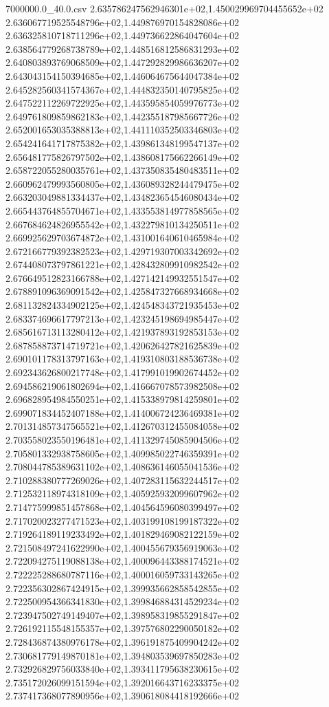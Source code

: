 \begin{filecontents*}{7000000.0_40.0.csv}
2.635786247562946301e+02,1.450029969704455652e+02
2.636067719525548796e+02,1.449876970154828086e+02
2.636325810718711296e+02,1.449736622864047604e+02
2.638564779268738789e+02,1.448516812586831293e+02
2.640803893769068509e+02,1.447292829986636207e+02
2.643043154150394685e+02,1.446064675644047384e+02
2.645282560341574367e+02,1.444832350140795825e+02
2.647522112269722925e+02,1.443595854059976773e+02
2.649761809859862183e+02,1.442355187985667726e+02
2.652001653035388813e+02,1.441110352503346803e+02
2.654241641717875382e+02,1.439861348199547137e+02
2.656481775826797502e+02,1.438608175662266149e+02
2.658722055280035761e+02,1.437350835480483511e+02
2.660962479993560805e+02,1.436089328244479475e+02
2.663203049881334437e+02,1.434823654546080434e+02
2.665443764855704671e+02,1.433553814977858565e+02
2.667684624826955542e+02,1.432279810134250511e+02
2.669925629703674872e+02,1.431001640610465984e+02
2.672166779392382523e+02,1.429719307003342692e+02
2.674408073797861221e+02,1.428432809910982542e+02
2.676649512823166788e+02,1.427142149932551547e+02
2.678891096369091542e+02,1.425847327668934668e+02
2.681132824334902125e+02,1.424548343721935453e+02
2.683374696617797213e+02,1.423245198694985447e+02
2.685616713113280412e+02,1.421937893192853153e+02
2.687858873714719721e+02,1.420626427821625839e+02
2.690101178313797163e+02,1.419310803188536738e+02
2.692343626800217748e+02,1.417991019902674452e+02
2.694586219061802694e+02,1.416667078573982508e+02
2.696828954984550251e+02,1.415338979814259801e+02
2.699071834452407188e+02,1.414006724236469381e+02
2.701314857347565521e+02,1.412670312455084058e+02
2.703558023550196481e+02,1.411329745085904506e+02
2.705801332938758605e+02,1.409985022746359391e+02
2.708044785389631102e+02,1.408636146055041536e+02
2.710288380777269026e+02,1.407283115632244517e+02
2.712532118974318109e+02,1.405925932099607962e+02
2.714775999851457868e+02,1.404564596080399497e+02
2.717020023277471523e+02,1.403199108199187322e+02
2.719264189119233492e+02,1.401829469082122159e+02
2.721508497241622990e+02,1.400455679356919063e+02
2.722094275119088138e+02,1.400096443388174521e+02
2.722225288680787116e+02,1.400016059733143265e+02
2.722356302867424915e+02,1.399935662858542855e+02
2.722500954366341830e+02,1.399846884314529234e+02
2.723947502749149407e+02,1.398958319855291847e+02
2.726192115548155357e+02,1.397576802290050182e+02
2.728436874380976178e+02,1.396191875409904242e+02
2.730681779149870181e+02,1.394803539697850283e+02
2.732926829756033840e+02,1.393411795638230615e+02
2.735172026099151594e+02,1.392016643716233375e+02
2.737417368077890956e+02,1.390618084418192666e+02

\end{filecontents*}
